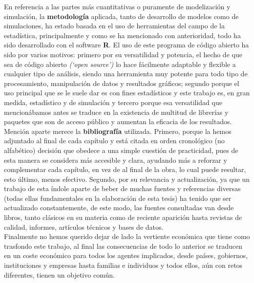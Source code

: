 En referencia a las partes más cuantitativas o puramente de modelización y simulación, la \textbf{metodología} aplicada, tanto de desarrollo de modelos como de simulaciones, ha estado basada en el uso de herramientas del campo de la estadística, principalmente y como se ha mencionado con anterioridad, todo ha sido desarrollado con el software \textsf{\textbf{R}}. El uso de este programa de código abierto ha sido por varios motivos: primero por su versatilidad y potencia, el hecho de que sea de código abierto \textit{(`open source')} lo hace fácilmente adaptable y flexible a cualquier tipo de análisis, siendo una herramienta muy potente para todo tipo de procesamiento, manipulación de datos y resultados gráficos; segundo porque el uso principal que se le suele dar es con fines estadísticos y este trabajo es, en gran medida, estadístico y de simulación y tercero porque esa versatilidad que mencionábamos antes se traduce en la existencia de multitud de librerías y paquetes que son de acceso público y aumentan la eficacia de los resultados.\\

Menci\'on aparte merece la \textbf{bibliograf\'ia} utilizada. Primero, porque la hemos adjuntado al final de cada capítulo y está citada en orden cronológico (no alfabético) decisión que obedece a una simple cuestión de practicidad, pues de esta manera se considera más accesible y clara, ayudando más a reforzar y complementar cada capítulo, en vez de al final de la obra, lo cual puede resultar, esto último, menos efectivo. Segundo, por su relevancia y actualización, ya que un trabajo de esta índole aparte de beber de muchas fuentes y referencias diversas (todas ellas fundamentales en la elaboración de esta tesis) ha tenido que ser actualizado constantemente, de este modo, las fuentes consultadas van desde libros, tanto clásicos en su materia como de reciente aparición hasta revistas de calidad, informes, art\'iculos t\'ecnicos y bases de datos.\\

Finalmente no hemos querido dejar de lado la vertiente econ\'omica que tiene como trasfondo este trabajo, al final las consecuencias de todo lo anterior se traducen en un coste económico para todos los agentes implicados, desde países, gobiernos, instituciones y empresas hasta familias e individuos y todos ellos, aún con retos diferentes, tienen un objetivo común.

\newpage

